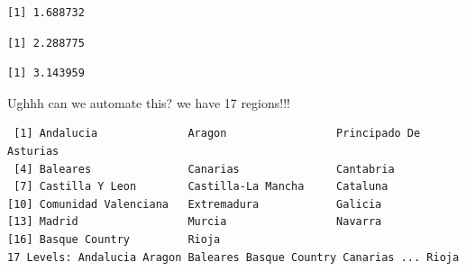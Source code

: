 \documentclass[
  letterpaper,
  DIV=11,
  numbers=noendperiod]{scrreprt}
\newenvironment{Shaded}{\begin{snugshade}}{\end{snugshade}}
\newcommand{\DocumentationTok}[1]{\textcolor[rgb]{0.37,0.37,0.37}{\textit{#1}}}
\newcommand{\FunctionTok}[1]{\textcolor[rgb]{0.28,0.35,0.67}{#1}}
\newcommand{\NormalTok}[1]{\textcolor[rgb]{0.00,0.23,0.31}{#1}}
\newcommand{\OtherTok}[1]{\textcolor[rgb]{0.00,0.23,0.31}{#1}}
\newcommand{\SpecialCharTok}[1]{\textcolor[rgb]{0.37,0.37,0.37}{#1}}
\newcommand{\StringTok}[1]{\textcolor[rgb]{0.13,0.47,0.30}{#1}}
\begin{document}
\begin{verbatim}
[1] 1.688732
\end{verbatim}

\begin{Shaded}
\end{Shaded}

\begin{verbatim}
[1] 2.288775
\end{verbatim}

\begin{Shaded}
\end{Shaded}

\begin{verbatim}
[1] 3.143959
\end{verbatim}

Ughhh can we automate this? we have 17 regions!!!

\begin{Shaded}
\end{Shaded}

\begin{verbatim}
 [1] Andalucia              Aragon                 Principado De Asturias
 [4] Baleares               Canarias               Cantabria             
 [7] Castilla Y Leon        Castilla-La Mancha     Cataluna              
[10] Comunidad Valenciana   Extremadura            Galicia               
[13] Madrid                 Murcia                 Navarra               
[16] Basque Country         Rioja                 
17 Levels: Andalucia Aragon Baleares Basque Country Canarias ... Rioja
\end{verbatim}
\end{document}
